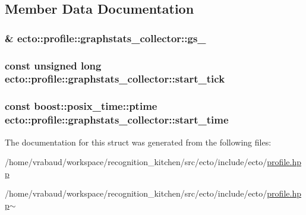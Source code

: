 \subsection{Member Data Documentation}
\hypertarget{structecto_1_1profile_1_1graphstats__collector_ad2a745e661114e28bd044844bf2b60fd}{
\subsubsection[{gs\-\_\-}]{ \& ecto\-::profile\-::graphstats\-\_\-collector\-::gs\-\_\-}}\label{structecto_1_1profile_1_1graphstats__collector_ad2a745e661114e28bd044844bf2b60fd}
\hypertarget{structecto_1_1profile_1_1graphstats__collector_a7a840b075fd490da5107ea538614d017}{
\subsubsection[{start\-\_\-tick}]{\setlength{\rightskip}{0pt plus 5cm}const unsigned long ecto\-::profile\-::graphstats\-\_\-collector\-::start\-\_\-tick}}\label{structecto_1_1profile_1_1graphstats__collector_a7a840b075fd490da5107ea538614d017}
\hypertarget{structecto_1_1profile_1_1graphstats__collector_a85cb67d72c9d1072634b879776e2e4b8}{
\subsubsection[{start\-\_\-time}]{\setlength{\rightskip}{0pt plus 5cm}const boost\-::posix\-\_\-time\-::ptime ecto\-::profile\-::graphstats\-\_\-collector\-::start\-\_\-time}}\label{structecto_1_1profile_1_1graphstats__collector_a85cb67d72c9d1072634b879776e2e4b8}


The documentation for this struct was generated from the following files\-:\begin{DoxyCompactItemize}
\item 
/home/vrabaud/workspace/recognition\-\_\-kitchen/src/ecto/include/ecto/\hyperlink{profile_8hpp}{profile.\-hpp}\item 
/home/vrabaud/workspace/recognition\-\_\-kitchen/src/ecto/include/ecto/\hyperlink{profile_8hpp~}{profile.\-hpp$\sim$}\end{DoxyCompactItemize}
